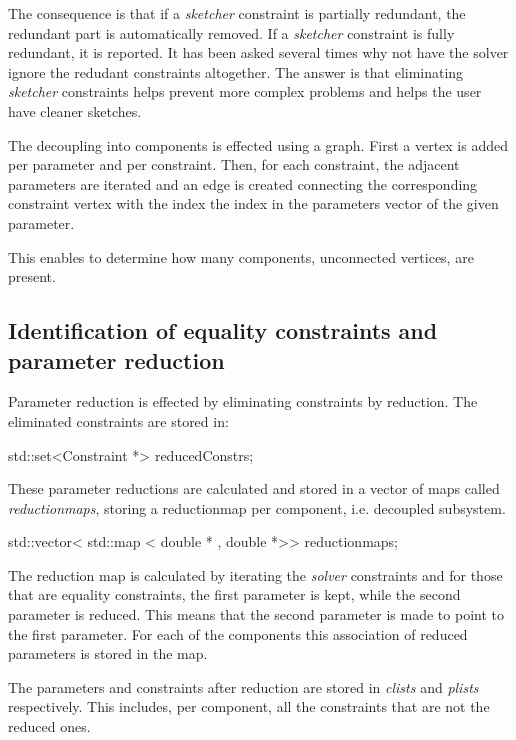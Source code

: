 \documentclass[12pt,twoside,a4paper]{book}
\begin{document}
    The consequence is that if a \emph{sketcher} constraint is partially redundant, the redundant part is automatically removed. If a \emph{sketcher} constraint is fully redundant, it is reported. It has been asked several times why not have the solver ignore the redudant constraints altogether. The answer is that eliminating \emph{sketcher} constraints helps prevent more complex problems and helps the user have cleaner sketches.

    The decoupling into components is effected using a graph. First a vertex is added per parameter and per constraint. Then, for each constraint, the adjacent parameters are iterated and an edge is created connecting the corresponding constraint vertex with the index the index in the parameters vector of the given parameter.

    This enables to determine how many components, unconnected vertices, are present.

    \subsection{Identification of equality constraints and parameter reduction}

    Parameter reduction is effected by eliminating constraints by reduction. The eliminated constraints are stored in:

    \begin{codequote}
    std::set\textless{}Constraint *\textgreater{} reducedConstrs;
    \end{codequote}

    These parameter reductions are calculated and stored in a vector of maps called \emph{reductionmaps}, storing a reductionmap per component, i.e. decoupled subsystem.

    \begin{codequote}
    std::vector\textless{} std::map \textless{} double * , double *\textgreater{}\textgreater{} reductionmaps;
    \end{codequote}

    The reduction map is calculated by iterating the \emph{solver} constraints and for those that are equality constraints, the first parameter is kept, while the second parameter is reduced. This means that the second parameter is made to point to the first parameter. For each of the components this association of reduced parameters is stored in the map.

    The parameters and constraints after reduction are stored in \emph{clists} and \emph{plists} respectively. This includes, per component, all the constraints that are not the reduced ones.
\end{document}
